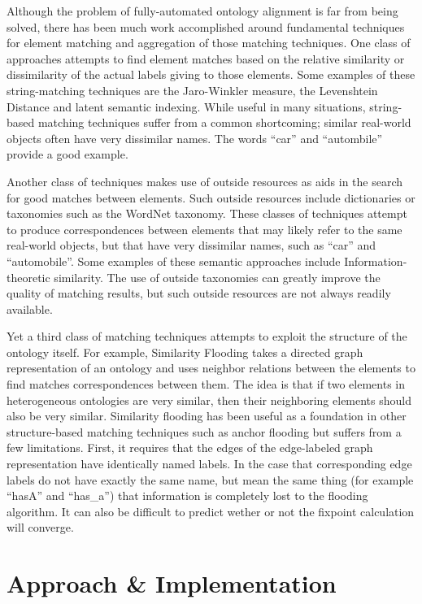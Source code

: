 \documentclass[letterpaper,twocolumn,12pt]{article}
\begin{document}
Although the problem of fully-automated ontology alignment is far from being solved,
there has been much work accomplished around fundamental techniques for element
matching and aggregation of those matching techniques. One class of approaches
attempts to find element matches based on the relative similarity or dissimilarity
of the actual labels giving to those elements. Some examples of these string-matching 
techniques are the Jaro-Winkler measure, the Levenshtein Distance and latent semantic 
indexing.
%
While useful in many situations, string-based matching techniques suffer from a common 
shortcoming; similar real-world objects often have very dissimilar names. The words
``car'' and ``autombile'' provide a good example.

Another class of techniques makes use of outside resources as aids in the search for
good matches between elements. Such outside resources include dictionaries or taxonomies
such as the WordNet taxonomy. These classes of techniques attempt to produce correspondences
between elements that may likely refer to the same real-world objects, but that have very
dissimilar names, such as ``car'' and ``automobile''. Some examples of these semantic 
approaches include Information-theoretic similarity.
%
The use of outside taxonomies can greatly improve the quality of matching results,
but such outside resources are not always readily available.

Yet a third class of matching techniques attempts to exploit the structure of the ontology
itself. For example, Similarity Flooding takes a directed graph representation of an 
ontology and uses neighbor relations between the elements to find matches correspondences
between them. The idea is that if two elements in heterogeneous ontologies are very similar,
then their neighboring elements should also be very similar.
%
Similarity flooding has been useful as a foundation in other structure-based
matching techniques such as anchor flooding 
but suffers from 
a few limitations. First, it requires that the edges of the edge-labeled graph 
representation have identically named labels. In the case that corresponding edge labels
do not have exactly the same name, but mean the same thing (for example ``hasA'' and ``has\_a'')
that information is completely lost to the flooding algorithm. It can also be difficult to predict
wether or not the fixpoint calculation will converge.
\newline

\section{Approach \& Implementation}
\label{sec:approach}
\end{document}
